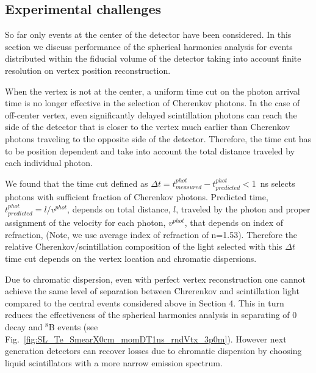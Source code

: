 \subsection{Experimental challenges}

So far only events at the center of the detector have been
considered. In this section we discuss performance of the spherical
harmonics analysis for events distributed within the fiducial volume
of the detector taking into account finite resolution on vertex
position reconstruction.

When the vertex is not at the center, a uniform time cut on the photon
arrival time is no longer effective in the selection of Cherenkov
photons. In the case of off-center vertex, even significantly delayed
scintillation photons can reach the side of the detector that is
closer to the vertex much earlier than Cherenkov photons traveling to
the opposite side of the detector. Therefore, the time cut has to be
position dependent and take into account the total distance traveled
by each individual photon.

We found that the time cut defined as $\Delta t=t^{phot}_{measured} -
t^{phot}_{predicted}<$1~ns selects photons with sufficient fraction of
Cherenkov photons. Predicted time, $ t^{phot}_{predicted}=l/v^{phot}$,
depends on total distance, $l$, traveled by the photon and proper
assignment of the velocity for each photon, $v^{phot}$, that depends
on index of refraction, (Note, we use average index of refraction of
n=1.53). Therefore the relative Cherenkov/scintillation composition of
the light selected with this $\Delta t$ time cut depends on the vertex
location and chromatic dispersions.

Due to chromatic dispersion, even with perfect vertex reconstruction
one cannot achieve the same level of separation between Chrerenkov and
scintillation light compared to the central events considered above in
Section 4. This in turn reduces the effectiveness of the spherical
harmonics analysis in separating of 0{\nbb} decay and $^{8}$B events
(see Fig.~\ref{fig:SL_Te_SmearX0cm_momDT1ns_rndVtx_3p0m}). However
next generation detectors can recover losses due to chromatic
dispersion by choosing liquid scintillators with a more narrow
emission spectrum.


